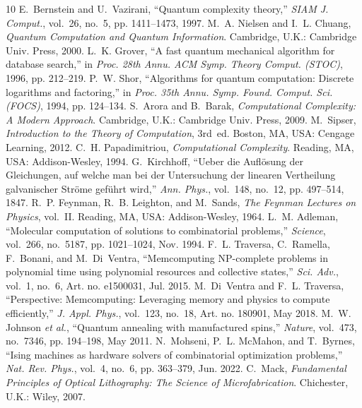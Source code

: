 \documentclass[letterpaper,journal]{IEEEtran}
\begin{document}
\begin{thebibliography}{10}
E.~Bernstein and U.~Vazirani, ``Quantum complexity theory,'' \emph{SIAM J.
Comput.}, vol.~26, no.~5, pp. 1411--1473, 1997.
M.~A. Nielsen and I.~L. Chuang, \emph{Quantum Computation and Quantum
Information}. Cambridge, U.K.: Cambridge Univ. Press, 2000.
L.~K. Grover, ``A fast quantum mechanical algorithm for database search,''
in \emph{Proc. 28th Annu. ACM Symp. Theory Comput. (STOC)}, 1996,
pp. 212--219.
P.~W. Shor, ``Algorithms for quantum computation: Discrete logarithms and
factoring,'' in \emph{Proc. 35th Annu. Symp. Found. Comput. Sci. (FOCS)},
1994, pp. 124--134.
S.~Arora and B.~Barak, \emph{Computational Complexity: A Modern Approach}.
Cambridge, U.K.: Cambridge Univ. Press, 2009.
M.~Sipser, \emph{Introduction to the Theory of Computation}, 3rd~ed.
Boston, MA, USA: Cengage Learning, 2012.
C.~H. Papadimitriou, \emph{Computational Complexity}. Reading, MA, USA:
Addison-Wesley, 1994.
G.~Kirchhoff, ``Ueber die Aufl\"osung der Gleichungen, auf welche man bei
der Untersuchung der linearen Vertheilung galvanischer Str\"ome gef\"uhrt
wird,'' \emph{Ann. Phys.}, vol.~148, no.~12, pp. 497--514, 1847.
R.~P. Feynman, R.~B. Leighton, and M.~Sands, \emph{The Feynman Lectures on
Physics}, vol.~II. Reading, MA, USA: Addison-Wesley, 1964.
L.~M. Adleman, ``Molecular computation of solutions to combinatorial
problems,'' \emph{Science}, vol.~266, no.~5187, pp. 1021--1024, Nov. 1994.
F.~L. Traversa, C.~Ramella, F.~Bonani, and M.~Di~Ventra, ``Memcomputing
NP-complete problems in polynomial time using polynomial resources and
collective states,'' \emph{Sci. Adv.}, vol.~1, no.~6, Art. no. e1500031,
Jul. 2015.
M.~Di~Ventra and F.~L. Traversa, ``Perspective: Memcomputing: Leveraging
memory and physics to compute efficiently,'' \emph{J. Appl. Phys.},
vol.~123, no.~18, Art. no. 180901, May 2018.
M.~W. Johnson \emph{et al.}, ``Quantum annealing with manufactured spins,''
\emph{Nature}, vol.~473, no.~7346, pp. 194--198, May 2011.
N.~Mohseni, P.~L. McMahon, and T.~Byrnes, ``Ising machines as hardware
solvers of combinatorial optimization problems,'' \emph{Nat. Rev. Phys.},
vol.~4, no.~6, pp. 363--379, Jun. 2022.
C.~Mack, \emph{Fundamental Principles of Optical Lithography: The Science
of Microfabrication}. Chichester, U.K.: Wiley, 2007.
\end{thebibliography}
\end{document}
